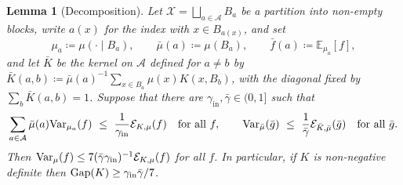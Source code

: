 \documentclass[aos]{imsart}%
\newcommand{\ambientspace}[0]{\mathcal{X}}
\newcommand{\bbE}[0]{\mathbb{E}}
\newcommand{\Var}{\mathrm{Var}}
\theoremstyle{plain}
\newtheorem{lemma}[theorem]{Lemma}
\theoremstyle{definition}
\begin{document}
    \begin{lemma}[Decomposition]
        \label{lemma:binary_decomposition}
        Let $\ambientspace=\bigsqcup_{a\in\mathcal{A}}B_a$ be a partition into
        non-empty blocks, write $a(x)$ for the index with $x\in B_{a(x)}$, and
        set
        \begin{equation*}
            \mu_a\coloneq\mu(\cdot\mid B_a),\qquad
            \bar\mu(a)\coloneq\mu(B_a),\qquad
            \bar f(a)\coloneq\bbE_{\mu_a}[f],
        \end{equation*}
        and let $\bar K$ be the kernel on $\mathcal{A}$ defined for $a\neq b$ by
        $\bar K(a,b)\coloneq\bar\mu(a)^{-1}\sum_{x\in B_a}\mu(x)K(x,B_b)$, with
        the diagonal fixed by $\sum_b\bar K(a,b)=1$. Suppose that there are
        $\gamma_{\mathrm{in}},\bar\gamma\in(0,1]$ such that
        \begin{equation}
            \label{eq:binary_two_poincare}
            \sum_{a\in\mathcal A}\bar\mu(a)\Var_{\mu_a}(f)
            \ \leq\ \frac{1}{\gamma_{\mathrm{in}}}\Dir_{K,\mu}(f)
            \quad\text{for all }f,
            \qquad
            \Var_{\bar\mu}(\bar g)\ \leq\ \frac{1}{\bar\gamma}
            \Dir_{\bar K,\bar\mu}(\bar g)
            \quad\text{for all }\bar g .
        \end{equation}
        Then $\Var_\mu(f)\leq7(\bar\gamma\gamma_{\mathrm{in}})^{-1}
        \Dir_{K,\mu}(f)$ for all $f$. In particular, if $K$ is non-negative
        definite then $\mathrm{Gap}(K)\geq\gamma_{\mathrm{in}}\bar\gamma/7$.
    \end{lemma}
\end{document}
